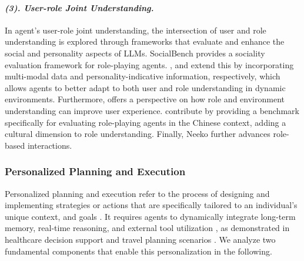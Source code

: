 \paragraph{\textbf{\textit{{(3). User-role Joint Understanding.}}}}
In agent's user-role joint understanding, the intersection of user and role understanding is explored through frameworks that evaluate and enhance the social and personality aspects of LLMs. SocialBench \citet{chen2024socialbench} provides a sociality evaluation framework for role-playing agents. \citet{dai2024mmrole}, and \cite{ran2024capturing} extend this by incorporating multi-modal data and personality-indicative information, respectively, which allows agents to better adapt to both user and role understanding in dynamic environments. Furthermore, \citet{wang2023enabling} offers a perspective on how role and environment understanding can improve user experience. \citet{tu2024charactereval} contribute by providing a benchmark specifically for evaluating role-playing agents in the Chinese context, adding a cultural dimension to role understanding. Finally, Neeko \cite{yu2024neeko} further advances role-based interactions.


\subsubsection{\textbf{Personalized Planning and Execution}}
Personalized planning and execution refer to the process of designing and implementing strategies or actions that are specifically tailored to an individual’s unique context, and goals \cite{huang2022language,zhangbootstrap,park2023generative,singh2024personal}. It requires agents to dynamically integrate long-term memory, real-time reasoning, and external tool utilization \cite{hong2023metagpt,zheng2023agents,hongru2023large}, as demonstrated in healthcare decision support \cite{abbasian2023conversational} and travel planning scenarios \cite{cai2025large}. We analyze two fundamental components that enable this personalization in the following.

